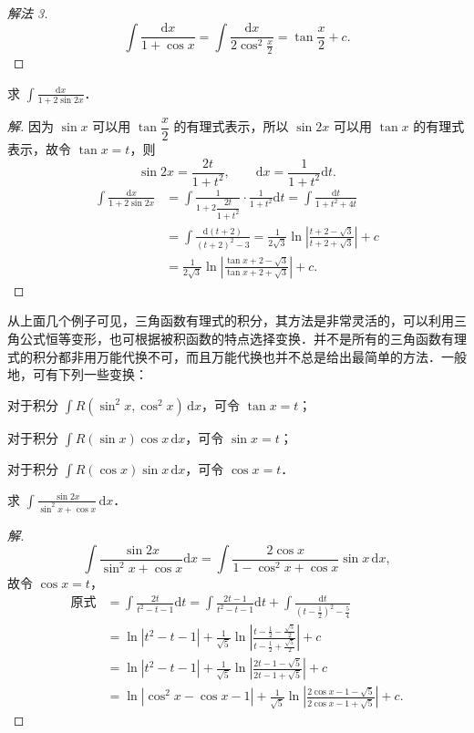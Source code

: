 \begin{proof}[解法 3]
\[
\int\frac{\mathrm{d}x}{1+\cos x}
= \int\frac{\mathrm{d}x}{2\cos^{2}\frac{x}{2}}
= \tan\frac{x}{2}+c.
\]
\end{proof}

\begin{example}\label{ex:6-2-27}
求 $\displaystyle\int\frac{\mathrm{d}x}{1+2\sin 2x}$．
\end{example}

\begin{proof}[解]
因为 $\sin x$ 可以用 $\tan\dfrac{x}{2}$ 的有理式表示，所以 $\sin 2x$ 可以用 $\tan x$ 的有理式表示，故令 $\tan x = t$，则
\[
\sin 2x = \frac{2t}{1+t^{2}},\qquad \mathrm{d}x = \frac{1}{1+t^{2}}\mathrm{d}t.
\]
\[
\begin{aligned}
\int\frac{\mathrm{d}x}{1+2\sin 2x}
&= \int\frac{1}{1+2\dfrac{2t}{1+t^{2}}}\cdot\frac{1}{1+t^{2}}\mathrm{d}t
= \int\frac{\mathrm{d}t}{1+t^{2}+4t}\\
&= \int\frac{\mathrm{d}(t+2)}{(t+2)^{2}-3}
= \frac{1}{2\sqrt{3}}\ln\left|\frac{t+2-\sqrt{3}}{t+2+\sqrt{3}}\right|+c\\
&= \frac{1}{2\sqrt{3}}\ln\left|\frac{\tan x+2-\sqrt{3}}{\tan x+2+\sqrt{3}}\right|+c.
\end{aligned}
\]
\end{proof}

从上面几个例子可见，三角函数有理式的积分，其方法是非常灵活的，可以利用三角公式恒等变形，也可根据被积函数的特点选择变换．并不是所有的三角函数有理式的积分都非用万能代换不可，而且万能代换也并不总是给出最简单的方法．一般地，可有下列一些变换：

对于积分 $\int R(\sin^{2}x,\cos^{2}x)\,\mathrm{d}x$，可令 $\tan x = t$；

对于积分 $\int R(\sin x)\cos x\,\mathrm{d}x$，可令 $\sin x = t$；

对于积分 $\int R(\cos x)\sin x\,\mathrm{d}x$，可令 $\cos x = t$．

\begin{example}\label{ex:6-2-28}
求 $\displaystyle\int\frac{\sin 2x}{\sin^{2}x+\cos x}\,\mathrm{d}x$．
\end{example}

\begin{proof}[解]
\[
\int\frac{\sin 2x}{\sin^{2}x+\cos x}\mathrm{d}x
= \int\frac{2\cos x}{1-\cos^{2}x+\cos x}\sin x\,\mathrm{d}x,
\]
故令 $\cos x = t$，
\[
\begin{aligned}
\text{原式} &= \int\frac{2t}{t^{2}-t-1}\mathrm{d}t
= \int\frac{2t-1}{t^{2}-t-1}\mathrm{d}t+\int\frac{\mathrm{d}t}{\left(t-\frac{1}{2}\right)^{2}-\frac{5}{4}}\\
&= \ln\left|t^{2}-t-1\right|+\frac{1}{\sqrt{5}}\ln\left|\frac{t-\frac{1}{2}-\frac{\sqrt{5}}{2}}{t-\frac{1}{2}+\frac{\sqrt{5}}{2}}\right|+c\\
&= \ln\left|t^{2}-t-1\right|+\frac{1}{\sqrt{5}}\ln\left|\frac{2t-1-\sqrt{5}}{2t-1+\sqrt{5}}\right|+c\\
&= \ln\left|\cos^{2}x-\cos x-1\right|+\frac{1}{\sqrt{5}}\ln\left|\frac{2\cos x-1-\sqrt{5}}{2\cos x-1+\sqrt{5}}\right|+c.
\end{aligned}
\]
\end{proof}

